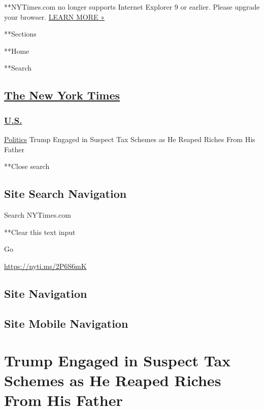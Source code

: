  **NYTimes.com no longer supports Internet Explorer 9 or earlier. Please
upgrade your browser.
\href{http://www.nytimes.com/content/help/site/ie9-support.html}{LEARN
MORE »}

**Sections

**Home

**Search

\hypertarget{the-new-york-times}{%
\subsection{\texorpdfstring{\href{http://www.nytimes.com/}{The New York
Times}}{The New York Times}}\label{the-new-york-times}}

\hypertarget{-us-}{%
\subsubsection{\texorpdfstring{
\href{https://www.nytimes.com/section/us}{U.S.} }{ U.S. }}\label{-us-}}

 \href{/section/politics}{Politics} \textbar{}Trump Engaged in Suspect
Tax Schemes as He Reaped Riches From His Father

**Close search

\hypertarget{site-search-navigation}{%
\subsection{Site Search Navigation}\label{site-search-navigation}}

Search NYTimes.com

**Clear this text input

Go

\url{https://nyti.ms/2P6S6mK}

\hypertarget{site-navigation}{%
\subsection{Site Navigation}\label{site-navigation}}

\hypertarget{site-mobile-navigation}{%
\subsection{Site Mobile Navigation}\label{site-mobile-navigation}}

\hypertarget{trump-engaged-in-suspect-tax-schemes-as-he-reaped-riches-from-his-father}{%
\section{Trump Engaged in Suspect Tax Schemes as He Reaped Riches From
His
Father}\label{trump-engaged-in-suspect-tax-schemes-as-he-reaped-riches-from-his-father}}

